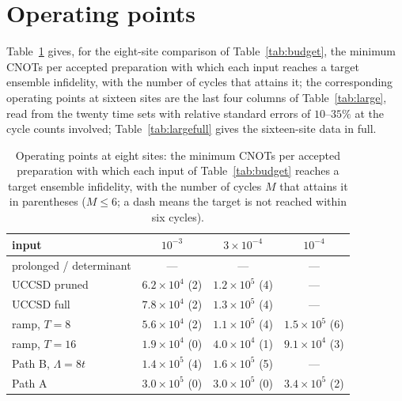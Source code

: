 \documentclass[a4paper,11pt,noarxiv]{quantumarticle}
\begin{document}
\section{Operating points}
\label{sm:ops}
Table~\ref{tab:ops} gives, for the eight-site comparison of
Table~\ref{tab:budget}, the minimum CNOTs per accepted preparation with
which each input reaches a target ensemble infidelity, with the number of
cycles that attains it; the corresponding operating points at sixteen sites
are the last four columns of Table~\ref{tab:large}, read from the twenty
time sets with relative standard errors of $10$--$35\%$ at the cycle counts
involved; Table~\ref{tab:largefull} gives the sixteen-site data in full.

\begin{table}[t]
  \caption{Operating points at eight sites: the minimum CNOTs per accepted
  preparation with which each input of Table~\ref{tab:budget} reaches a
  target ensemble infidelity, with the number of cycles $M$ that attains it
  in parentheses ($M\le6$; a dash means the target is not reached within
  six cycles).}
  \label{tab:ops}
  \centering\scriptsize
  \begin{tabular}{lccc}
  \toprule
  input & $10^{-3}$ & $3{\times}10^{-4}$ & $10^{-4}$\\
  \midrule
  prolonged / determinant & --- & --- & ---\\
  UCCSD pruned & $6.2{\times}10^{4}$ (2) & $1.2{\times}10^{5}$ (4) & ---\\
  UCCSD full & $7.8{\times}10^{4}$ (2) & $1.3{\times}10^{5}$ (4) & ---\\
  ramp, $T=8$ & $5.6{\times}10^{4}$ (2) & $1.1{\times}10^{5}$ (4) & $1.5{\times}10^{5}$ (6)\\
  ramp, $T=16$ & $1.9{\times}10^{4}$ (0) & $4.0{\times}10^{4}$ (1) & $9.1{\times}10^{4}$ (3)\\
  Path B, $\Lambda=8t$ & $1.4{\times}10^{5}$ (4) & $1.6{\times}10^{5}$ (5) & ---\\
  Path A & $3.0{\times}10^{5}$ (0) & $3.0{\times}10^{5}$ (0) & $3.4{\times}10^{5}$ (2)\\
  \bottomrule
  \end{tabular}
\end{table}
\end{document}
